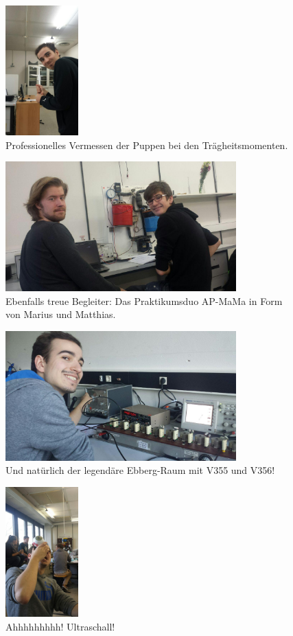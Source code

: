 \begin{figure}
  \centering
  \includegraphics[height=5cm]{extra/photo_2016-07-05_00-46-06.jpg}
  \caption{Professionelles Vermessen der Puppen bei den Trägheitsmomenten.}
\end{figure}

\begin{figure}
  \centering
  \includegraphics[height=5cm]{extra/photo_2016-07-05_00-45-21.jpg}
  \caption{Ebenfalls treue Begleiter: Das Praktikumsduo AP-MaMa in Form von Marius und Matthias.}
\end{figure}

\begin{figure}
  \centering
  \includegraphics[height=5cm]{extra/photo_2016-07-05_00-47-04.jpg}
  \caption{Und natürlich der legendäre Ebberg-Raum mit V355 und V356!}
\end{figure}

\begin{figure}
  \centering
  \includegraphics[height=5cm]{extra/photo_2016-07-05_00-48-00.jpg}
  \caption{Ahhhhhhhhh! Ultraschall!}
\end{figure}

